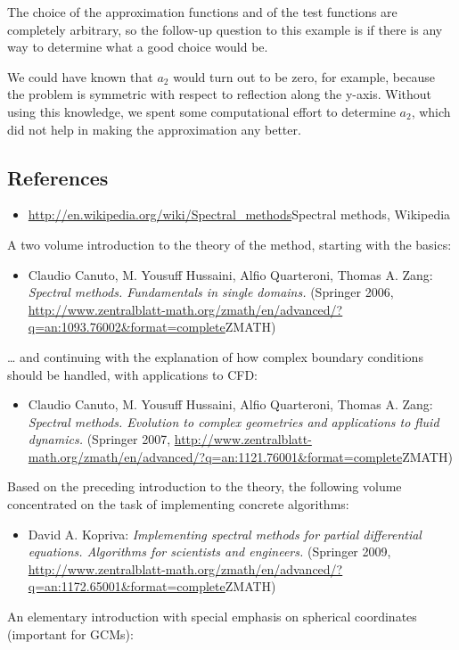 \documentclass[preprint, 5p, 10pt]{elsarticle}
\theoremstyle{plain}
\begin{document}
The choice of the approximation functions and of the test functions are completely arbitrary, so the follow-up question to this example is if there is any way to determine what a good choice would be.

We could have known that $a_2$ would turn out to be zero, for example, because the problem is symmetric with respect to reflection along the y-axis. Without using this knowledge, we spent some computational effort to determine $a_2$, which did not help in making the approximation any better.



\subsection*{{References}}\label{references_11}

\begin{itemize}%
\item \url{http://en.wikipedia.org/wiki/Spectral_methods}{Spectral methods}, Wikipedia

\end{itemize}
A two volume introduction to the theory of the method, starting with the basics:

\begin{itemize}%
\item Claudio Canuto, M. Yousuff Hussaini, Alfio Quarteroni, Thomas A. Zang: \emph{Spectral methods. Fundamentals in single domains.} 
(Springer 2006, \url{http://www.zentralblatt-math.org/zmath/en/advanced/?q=an:1093.76002&format=complete}{ZMATH})

\end{itemize}
\ldots{} and continuing with the explanation of how complex boundary conditions should be handled, with applications to CFD:

\begin{itemize}%
\item Claudio Canuto, M. Yousuff Hussaini, Alfio Quarteroni, Thomas A. Zang: \emph{Spectral methods. Evolution to complex geometries and applications to fluid dynamics.} (Springer 2007, \url{http://www.zentralblatt-math.org/zmath/en/advanced/?q=an:1121.76001&format=complete}{ZMATH})

\end{itemize}
Based on the preceding introduction to the theory, the following volume concentrated on the task of implementing concrete algorithms:

\begin{itemize}%
\item David A. Kopriva: \emph{Implementing spectral methods for partial differential equations. Algorithms for scientists and engineers.} (Springer 2009,
 \url{http://www.zentralblatt-math.org/zmath/en/advanced/?q=an:1172.65001&format=complete}{ZMATH})

\end{itemize}
An elementary introduction with special emphasis on spherical coordinates (important for GCMs):
\end{document}
